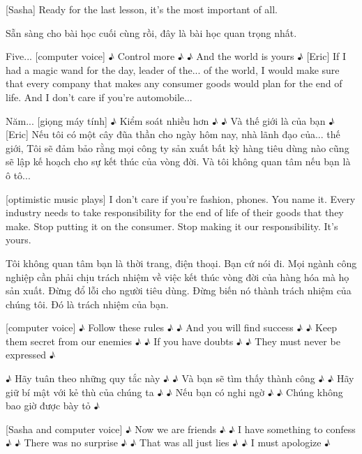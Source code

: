 \documentclass[a4paper]{article}
\begin{document}
	[Sasha] Ready for the last lesson, it's the most important of all.
	
	\begin{vietnamese-v2}
		[Sasha] Sẵn sàng cho bài học cuối cùng rồi, đây là bài học quan trọng nhất.
	\end{vietnamese-v2}
	
	Five...
	[computer voice] ♪ Control more ♪
	♪ And the world is yours ♪
	[Eric] If I had a magic wand for the day,
	leader of the... of the world,
	I would make sure that every company that makes any consumer goods would plan for the end of life.
	And I don't care if you're automobile...
	
	\begin{vietnamese-v2}
		Năm...
		[giọng máy tính] ♪ Kiểm soát nhiều hơn ♪
		♪ Và thế giới là của bạn ♪
		[Eric] Nếu tôi có một cây đũa thần cho ngày hôm nay,
		nhà lãnh đạo của... thế giới,
		Tôi sẽ đảm bảo rằng mọi công ty sản xuất bất kỳ hàng tiêu dùng nào cũng sẽ lập kế hoạch cho sự kết thúc của vòng đời.
		Và tôi không quan tâm nếu bạn là ô tô...
	\end{vietnamese-v2}
	
	[optimistic music plays]
	I don't care if you're fashion, phones.
	You name it.
	Every industry needs to take responsibility for the end of life of their goods that they make.
	Stop putting it on the consumer.
	Stop making it our responsibility.
	It's yours.
	
	\begin{vietnamese-v2}
		Tôi không quan tâm bạn là thời trang, điện thoại.
		Bạn cứ nói đi.
		Mọi ngành công nghiệp cần phải chịu trách nhiệm về việc kết thúc vòng đời của hàng hóa mà họ sản xuất.
		Đừng đổ lỗi cho người tiêu dùng.
		Đừng biến nó thành trách nhiệm của chúng tôi.
		Đó là trách nhiệm của bạn.
	\end{vietnamese-v2}
	
	
	[computer voice] ♪ Follow these rules ♪
	♪ And you will find success ♪
	♪ Keep them secret from our enemies ♪
	♪ If you have doubts ♪
	♪ They must never be expressed ♪
	
	\begin{vietnamese-v2}
		 ♪ Hãy tuân theo những quy tắc này ♪
		♪ Và bạn sẽ tìm thấy thành công ♪
		♪ Hãy giữ bí mật với kẻ thù của chúng ta ♪
		♪ Nếu bạn có nghi ngờ ♪
		♪ Chúng không bao giờ được bày tỏ ♪
	\end{vietnamese-v2}
	
	[Sasha and computer voice] ♪ Now we are friends ♪
	♪ I have something to confess ♪
	♪ There was no surprise ♪
	♪ That was all just lies ♪
	♪ I must apologize ♪
	
\end{document}
